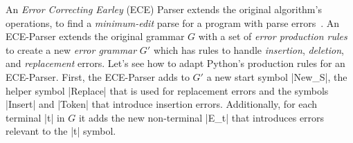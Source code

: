 %

%
An \emph{Error Correcting Earley} (ECE) Parser
extends the original algorithm's operations,
to find a \emph{minimum-edit} parse for a program
with parse errors~\citep{Aho_1972}.
%
An ECE-Parser extends the original grammar $G$
with a set of \emph{error production rules} to
create a new \emph{error grammar} $G'$ which has
rules to handle \emph{insertion}, \emph{deletion},
and \emph{replacement} errors.
%
Let's see how to adapt Python's
production rules for an ECE-Parser.
%
First, the ECE-Parser adds to $G'$ a new start symbol |New_S|, the helper
symbol |Replace| that is used for replacement errors and the symbols |Insert|
and |Token| that introduce insertion errors. Additionally, for each terminal |t|
in $G$ it adds the new non-terminal |E_t| that introduces errors relevant to the
|t| symbol.

